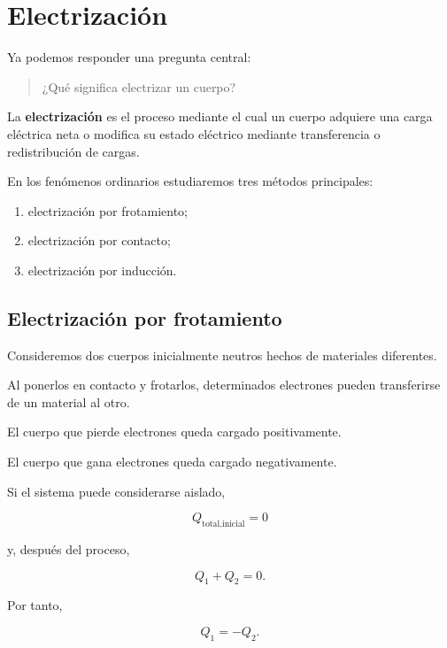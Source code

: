 \section{Electrización}

Ya podemos responder una pregunta central:

\begin{quote}
¿Qué significa electrizar un cuerpo?
\end{quote}

\begin{definicion}[Electrización]
La \textbf{electrización} es el proceso mediante el cual un cuerpo adquiere
una carga eléctrica neta o modifica su estado eléctrico mediante transferencia
o redistribución de cargas.
\end{definicion}

En los fenómenos ordinarios estudiaremos tres métodos principales:

\begin{enumerate}
    \item electrización por frotamiento;
    \item electrización por contacto;
    \item electrización por inducción.
\end{enumerate}



\subsection{Electrización por frotamiento}

Consideremos dos cuerpos inicialmente neutros hechos de materiales diferentes.

Al ponerlos en contacto y frotarlos, determinados electrones pueden
transferirse de un material al otro.

El cuerpo que pierde electrones queda cargado positivamente.

El cuerpo que gana electrones queda cargado negativamente.

Si el sistema puede considerarse aislado,

\[
Q_{\text{total,inicial}}=0
\]

y, después del proceso,

\[
Q_1+Q_2=0.
\]

Por tanto,

\begin{equation}
    Q_1=-Q_2.
\end{equation}

